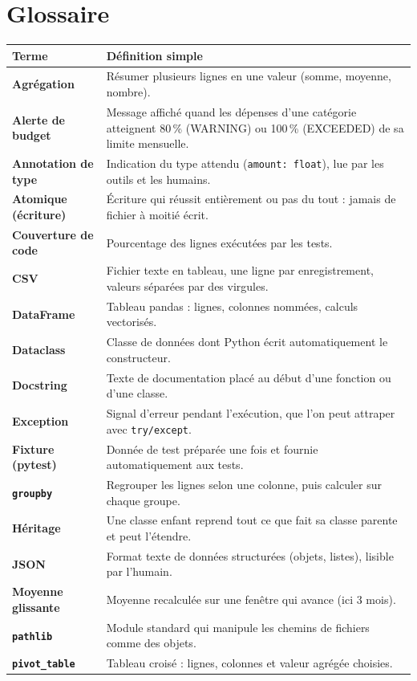 \documentclass[11pt,a4paper]{article}
\newcommand{\code}[1]{{\NoAutoSpacing\texttt{#1}}}
\begin{document}
\section{Glossaire}
\begin{longtable}{@{}>{\raggedright\bfseries}p{3.6cm}>{\raggedright\arraybackslash}p{11.6cm}@{}}
\toprule
\normalfont\textbf{Terme} & \textbf{Définition simple} \\
\midrule
\endhead
Agrégation & Résumer plusieurs lignes en une valeur (somme, moyenne, nombre). \\
Alerte de budget & Message affiché quand les dépenses d'une catégorie atteignent 80\,\% (WARNING) ou 100\,\% (EXCEEDED) de sa limite mensuelle. \\
Annotation de type & Indication du type attendu (\code{amount: float}), lue par les outils et les humains. \\
Atomique (écriture) & Écriture qui réussit entièrement ou pas du tout : jamais de fichier à moitié écrit. \\
Couverture de code & Pourcentage des lignes exécutées par les tests. \\
CSV & Fichier texte en tableau, une ligne par enregistrement, valeurs séparées par des virgules. \\
DataFrame & Tableau pandas : lignes, colonnes nommées, calculs vectorisés. \\
Dataclass & Classe de données dont Python écrit automatiquement le constructeur. \\
Docstring & Texte de documentation placé au début d'une fonction ou d'une classe. \\
Exception & Signal d'erreur pendant l'exécution, que l'on peut attraper avec \code{try/except}. \\
Fixture (pytest) & Donnée de test préparée une fois et fournie automatiquement aux tests. \\
\code{groupby} & Regrouper les lignes selon une colonne, puis calculer sur chaque groupe. \\
Héritage & Une classe enfant reprend tout ce que fait sa classe parente et peut l'étendre. \\
JSON & Format texte de données structurées (objets, listes), lisible par l'humain. \\
Moyenne glissante & Moyenne recalculée sur une fenêtre qui avance (ici 3 mois). \\
\code{pathlib} & Module standard qui manipule les chemins de fichiers comme des objets. \\
\code{pivot\_table} & Tableau croisé : lignes, colonnes et valeur agrégée choisies. \\

\end{longtable}
\end{document}
